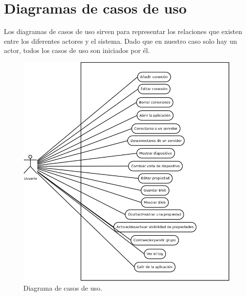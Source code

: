\newpage
\section{Diagramas de casos de uso}

Los diagramas de casos de uso sirven para representar los relaciones que existen entre los diferentes actores y el sistema. Dado que en nuestro caso solo hay un actor, todos los casos de uso son iniciados por él.

\bigskip

\begin{figure}[!ht]
  \begin{center}
  \includegraphics[width=1\textwidth]{../images/diagrama_casos_de_uso.png}
  \caption{Diagrama de casos de uso.}
  \label{fig:diag_scrum}
  \end{center}
\end{figure}